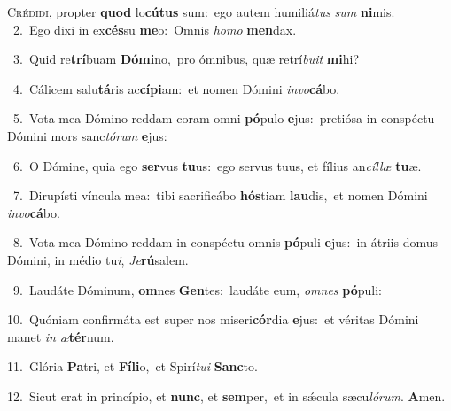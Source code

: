 \lettrine{\initial\textcolor{\initialcolor}{C}}{rédidi,} propter \textbf{quod} lo\-\textbf{cú}\-\textbf{tus} sum:~\star ego autem humiliá\textit{tus} \textit{sum} \textbf{ni}\-mis.\\
{\numbfont\textcolor{\numbcolor}{~2.}}~Ego dixi in ex\-\textbf{cés}\-su \textbf{me}\-o:~\star Omnis \textit{ho}\-\textit{mo} \textbf{men}\-dax.\par
{\numbfont\textcolor{\numbcolor}{~3.}}~Quid re\-\textbf{trí}\-buam \textbf{Dó}\-\textbf{mi}no,~\star pro ómnibus, quæ retrí\-\textit{bu}\-\textit{it} \textbf{mi}\-hi?\par
{\numbfont\textcolor{\numbcolor}{~4.}}~Cálicem salu\-\textbf{tá}\-ris ac\-\textbf{cí}\-\textbf{pi}am:~\star et nomen Dómini \textit{in}\-\textit{vo}\textbf{cá}bo.\par
{\numbfont\textcolor{\numbcolor}{~5.}}~Vota mea Dómino reddam coram omni \textbf{pó}\-pulo \textbf{e}\-jus:~\star pretiósa in conspéctu Dómini mors sanc\-\textit{tó}\-\textit{rum} \textbf{e}\-jus:\par
{\numbfont\textcolor{\numbcolor}{~6.}}~O Dómine, quia ego \textbf{ser}\-vus \textbf{tu}\-us:~\star ego servus tuus, et fílius an\-\textit{cíl}\-\textit{læ} \textbf{tu}\-æ.\par
{\numbfont\textcolor{\numbcolor}{~7.}}~Dirupísti víncula mea:~\dagger tibi sacrificábo \textbf{hós}\-tiam \textbf{lau}\-dis,~\star et nomen Dómini \textit{in}\-\textit{vo}\textbf{cá}bo.\par
{\numbfont\textcolor{\numbcolor}{~8.}}~Vota mea Dómino reddam in conspéctu omnis \textbf{pó}\-puli \textbf{e}\-jus:~\star in átriis domus Dómini, in médio tu\-\textit{i}\-, \textit{Je}\-\textbf{rú}salem.\par
{\numbfont\textcolor{\numbcolor}{~9.}}~Laudáte Dóminum, \textbf{om}\-nes \textbf{Gen}\-tes:~\star laudáte eum, \textit{om}\-\textit{nes} \textbf{pó}\-puli:\par
{\numbfont\textcolor{\numbcolor}{10.}}~Quóniam confirmáta est super nos miseri\-\textbf{cór}\-dia \textbf{e}\-jus:~\star et véritas Dómini manet \textit{in} \textit{æ}\-\textbf{tér}num.\par
{\numbfont\textcolor{\numbcolor}{11.}}~Glória \textbf{Pa}\-tri, et \textbf{Fí}\-\textbf{li}o,~\star et Spirí\-\textit{tu}\-\textit{i} \textbf{Sanc}\-to.\par
{\numbfont\textcolor{\numbcolor}{12.}}~Sicut erat in princípio, et \textbf{nunc}\-, et \textbf{sem}\-per,~\star et in sǽcula sæcu\-\textit{ló}\-\textit{rum}. \textbf{A}\-men.\par
